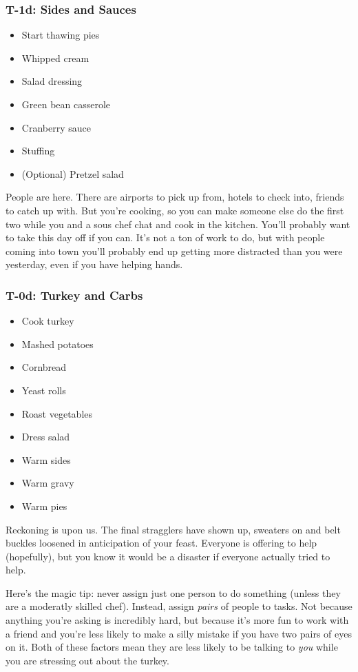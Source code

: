 \documentclass[12pt]{article}
\begin{document}
	\subsubsection{T-1d: Sides and Sauces}
	\begin{itemize}
		\item Start thawing pies
		\item Whipped cream
		\item Salad dressing
		\item Green bean casserole
		\item Cranberry sauce
		\item Stuffing
		\item (Optional) Pretzel salad
	\end{itemize}
	
	People are here. There are airports to pick up from, hotels to check into, friends to catch up with. But you're cooking, so you can make someone else do the first two while you and a sous chef chat and cook in the kitchen. You'll probably want to take this day off if you can. It's not a ton of work to do, but with people coming into town you'll probably end up getting more distracted than you were yesterday, even if you have helping hands.
	
	\subsubsection{T-0d: Turkey and Carbs}
	\begin{itemize}
		\item Cook turkey
		\item Mashed potatoes
		\item Cornbread
		\item Yeast rolls
		\item Roast vegetables
		\item Dress salad
		\item Warm sides
		\item Warm gravy
		\item Warm pies
	\end{itemize}
	
	Reckoning is upon us. The final stragglers have shown up, sweaters on and belt buckles loosened in anticipation of your feast. Everyone is offering to help (hopefully), but you know it would be a disaster if everyone actually tried to help.
	
	Here's the magic tip: never assign just one person to do something (unless they are a moderatly skilled chef). Instead, assign \textit{pairs} of people to tasks. Not because anything you're asking is incredibly hard, but because it's more fun to work with a friend and you're less likely to make a silly mistake if you have two pairs of eyes on it. Both of these factors mean they are less likely to be talking to \textit{you} while you are stressing out about the turkey.
	
\end{document}
